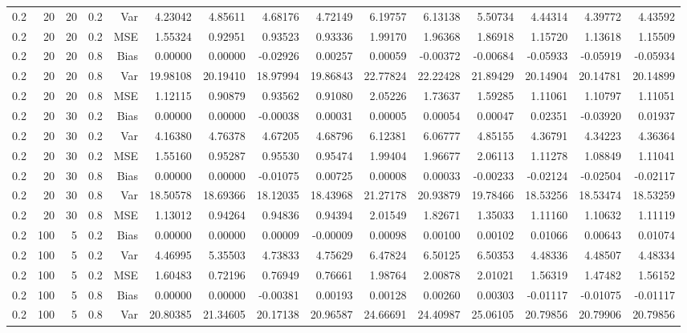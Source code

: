 \begin{table}[!htbp]
\begin{tabular}{lrrrrrrrrrrrrrr}
0.2 &  20 & 20 & 0.2 & Var & 4.23042 & 4.85611 & 4.68176 & 4.72149 & 6.19757 & 6.13138 & 5.50734 & 4.44314 & 4.39772 & 4.43592 \\
0.2 &  20 & 20 & 0.2 & MSE & 1.55324 & 0.92951 & 0.93523 & 0.93336 & 1.99170 & 1.96368 & 1.86918 & 1.15720 & 1.13618 & 1.15509 \\
0.2 &  20 & 20 & 0.8 & Bias & 0.00000 & 0.00000 & -0.02926 & 0.00257 & 0.00059 & -0.00372 & -0.00684 & -0.05933 & -0.05919 & -0.05934 \\
0.2 &  20 & 20 & 0.8 & Var & 19.98108 & 20.19410 & 18.97994 & 19.86843 & 22.77824 & 22.22428 & 21.89429 & 20.14904 & 20.14781 & 20.14899 \\
0.2 &  20 & 20 & 0.8 & MSE & 1.12115 & 0.90879 & 0.93562 & 0.91080 & 2.05226 & 1.73637 & 1.59285 & 1.11061 & 1.10797 & 1.11051 \\
0.2 &  20 & 30 & 0.2 & Bias & 0.00000 & 0.00000 & -0.00038 & 0.00031 & 0.00005 & 0.00054 & 0.00047 & 0.02351 & -0.03920 & 0.01937 \\
0.2 &  20 & 30 & 0.2 & Var & 4.16380 & 4.76378 & 4.67205 & 4.68796 & 6.12381 & 6.06777 & 4.85155 & 4.36791 & 4.34223 & 4.36364 \\
0.2 &  20 & 30 & 0.2 & MSE & 1.55160 & 0.95287 & 0.95530 & 0.95474 & 1.99404 & 1.96677 & 2.06113 & 1.11278 & 1.08849 & 1.11041 \\
0.2 &  20 & 30 & 0.8 & Bias & 0.00000 & 0.00000 & -0.01075 & 0.00725 & 0.00008 & 0.00033 & -0.00233 & -0.02124 & -0.02504 & -0.02117 \\
0.2 &  20 & 30 & 0.8 & Var & 18.50578 & 18.69366 & 18.12035 & 18.43968 & 21.27178 & 20.93879 & 19.78466 & 18.53256 & 18.53474 & 18.53259 \\
0.2 &  20 & 30 & 0.8 & MSE & 1.13012 & 0.94264 & 0.94836 & 0.94394 & 2.01549 & 1.82671 & 1.35033 & 1.11160 & 1.10632 & 1.11119 \\
0.2 & 100 &  5 & 0.2 & Bias & 0.00000 & 0.00000 & 0.00009 & -0.00009 & 0.00098 & 0.00100 & 0.00102 & 0.01066 & 0.00643 & 0.01074 \\
0.2 & 100 &  5 & 0.2 & Var & 4.46995 & 5.35503 & 4.73833 & 4.75629 & 6.47824 & 6.50125 & 6.50353 & 4.48336 & 4.48507 & 4.48334 \\
0.2 & 100 &  5 & 0.2 & MSE & 1.60483 & 0.72196 & 0.76949 & 0.76661 & 1.98764 & 2.00878 & 2.01021 & 1.56319 & 1.47482 & 1.56152 \\
0.2 & 100 &  5 & 0.8 & Bias & 0.00000 & 0.00000 & -0.00381 & 0.00193 & 0.00128 & 0.00260 & 0.00303 & -0.01117 & -0.01075 & -0.01117 \\
0.2 & 100 &  5 & 0.8 & Var & 20.80385 & 21.34605 & 20.17138 & 20.96587 & 24.66691 & 24.40987 & 25.06105 & 20.79856 & 20.79906 & 20.79856 \\

\end{tabular}
\end{table}
